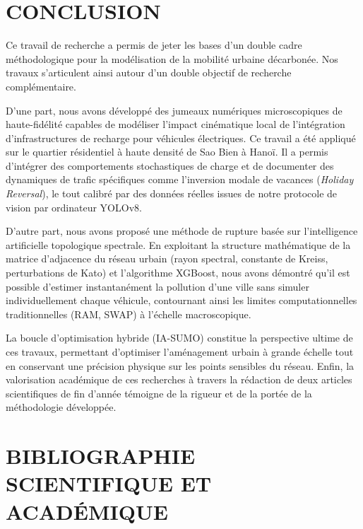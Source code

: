 \documentclass[10pt, a4paper]{article}
\begin{document}
\newpage

\section{CONCLUSION}\label{conclusion}

Ce travail de recherche a permis de jeter les bases d'un double cadre
méthodologique pour la modélisation de la mobilité urbaine décarbonée.
Nos travaux s'articulent ainsi autour d'un double objectif de recherche
complémentaire.

D'une part, nous avons développé des jumeaux numériques microscopiques
de haute-fidélité capables de modéliser l'impact cinématique local de
l'intégration d'infrastructures de recharge pour véhicules électriques.
Ce travail a été appliqué sur le quartier résidentiel à haute densité de
Sao Bien à Hanoï. Il a permis d'intégrer des comportements stochastiques
de charge et de documenter des dynamiques de trafic spécifiques comme
l'inversion modale de vacances (\emph{Holiday Reversal}), le tout
calibré par des données réelles issues de notre protocole de vision par
ordinateur YOLOv8.

D'autre part, nous avons proposé une méthode de rupture basée sur
l'intelligence artificielle topologique spectrale. En exploitant la
structure mathématique de la matrice d'adjacence du réseau urbain (rayon
spectral, constante de Kreiss, perturbations de Kato) et l'algorithme
XGBoost, nous avons démontré qu'il est possible d'estimer instantanément
la pollution d'une ville sans simuler individuellement chaque véhicule,
contournant ainsi les limites computationnelles traditionnelles (RAM,
SWAP) à l'échelle macroscopique.

La boucle d'optimisation hybride (IA-SUMO) constitue la perspective
ultime de ces travaux, permettant d'optimiser l'aménagement urbain à
grande échelle tout en conservant une précision physique sur les points
sensibles du réseau. Enfin, la valorisation académique de ces recherches
à travers la rédaction de deux articles scientifiques de fin d'année
témoigne de la rigueur et de la portée de la méthodologie développée.

\newpage

\section{BIBLIOGRAPHIE SCIENTIFIQUE ET
ACADÉMIQUE}\label{bibliographie-scientifique-et-acaduxe9mique}
\end{document}
